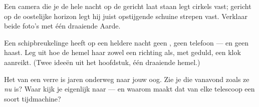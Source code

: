 \begin{exercise}[$\star\star$]\label{exo:g5:stars-night-sky:9}
Een camera die je de hele nacht op de  gericht laat staan
legt cirkels vast; gericht op de oostelijke horizon legt hij juist
opstijgende schuine strepen vast. Verklaar beide foto's met één
draaiende Aarde.
\end{exercise}

\begin{exercise}[$\star\star$]\label{exo:g5:stars-night-sky:10}
Een schipbreukelinge heeft op een heldere nacht geen , geen
telefoon --- en geen haast. Leg uit hoe de hemel haar zowel een
richting als, met geduld, een klok aanreikt. (Twee ideeën uit het
hoofdstuk, één draaiende hemel.)
\end{exercise}

\begin{exercise}[$\star\star$]\label{exo:g5:stars-night-sky:11}
Het  van een verre  is jaren onderweg naar jouw oog. Zie
je die  vanavond zoals ze \emph{nu} is? Waar kijk je eigenlijk naar
--- en waarom maakt dat van elke telescoop een soort tijdmachine?
\end{exercise}
